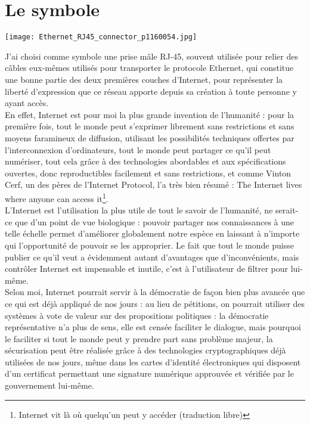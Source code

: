 \documentclass[12pt,a4paper]{article}
\begin{document}
{\part{Le symbole}

\texttt{[image: Ethernet\_RJ45\_connector\_p1160054.jpg]}

J'ai choisi comme symbole une prise mâle RJ-45, souvent utilisée pour relier des câbles eux-mêmes utilisés pour transporter le protocole Ethernet, qui constitue une bonne partie des deux premières couches d'Internet, pour représenter la liberté d'expression que ce réseau apporte depuis sa création à toute personne y ayant accès.\\

En effet, Internet est pour moi la plus grande invention de l'humanité : pour la première fois, tout le monde peut s'exprimer librement sans restrictions et sans moyens faramineux de diffusion, utilisant les possibilités techniques offertes par l'interconnexion d'ordinateurs, tout le monde peut partager ce qu'il peut numériser, tout cela grâce à des technologies abordables et aux spécifications ouvertes, donc reproductibles facilement et sans restrictions, et comme Vinton Cerf, un des pères de l'Internet Protocol,  l'a très bien résumé : \og{}The Internet lives where anyone can access it\footnote{Internet vit là où quelqu'un peut y accéder (traduction libre)}\fg{}.\\

L'Internet est l'utilisation la plus utile de tout le savoir de l'humanité, ne serait-ce que d'un point de vue biologique : pouvoir partager nos connaissances à une telle échelle permet d'améliorer globalement notre espèce en laissant à n'importe qui l'opportunité de pouvoir se les approprier. Le fait que tout le monde puisse publier ce qu'il veut a évidemment autant d'avantages que d'inconvénients, mais contrôler Internet est impensable et inutile, c'est à l'utilisateur de filtrer pour lui-même.\\

Selon moi, Internet pourrait servir à la démocratie de façon bien plus avancée que ce qui est déjà appliqué de nos jours : au lieu de pétitions, on pourrait utiliser des systèmes à vote de valeur sur des propositions politiques : la \og{}démocratie\fg{} représentative n'a plus de sens, elle est censée faciliter le dialogue, mais pourquoi le faciliter si tout le monde peut y prendre part sans problème majeur, la sécurisation peut être réalisée grâce à des technologies cryptographiques déjà utilisées de nos jours, même dans les cartes d'identité électroniques qui disposent d'un certificat permettant une signature numérique approuvée et vérifiée par le gouvernement lui-même.\\

}
\end{document}
